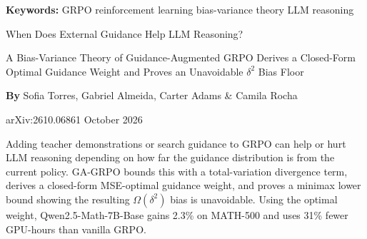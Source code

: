 \documentclass[10pt,twocolumn]{article}
\begin{document}
\setlength{\parindent}{0pt}
\setlength{\parskip}{4pt}

{\small\color{keywordgray}\textbf{Keywords:}
  GRPO \textbullet{}
  reinforcement learning \textbullet{}
  bias-variance theory \textbullet{}
  LLM reasoning}\par\vspace{4pt}

{\LARGE\bfseries\raggedright
  When Does External Guidance Help LLM Reasoning?}\par\vspace{4pt}

{\large\itshape\raggedright
  A Bias-Variance Theory of Guidance-Augmented GRPO Derives a Closed-Form
  Optimal Guidance Weight and Proves an Unavoidable $\delta^2$ Bias Floor}\par\vspace{6pt}

{\small\textbf{By} Sofia Torres, Gabriel Almeida, Carter Adams \& Camila Rocha}\par\vspace{2pt}

{\small\color{keywordgray}arXiv:2610.06861 \textbullet{} October 2026}
\par\vspace{2pt}\noindent{\color{rulered}\rule{\columnwidth}{0.6pt}}\vspace{6pt}

Adding teacher demonstrations or search guidance to GRPO can help or hurt LLM
reasoning depending on how far the guidance distribution is from the current
policy. GA-GRPO bounds this with a total-variation divergence term, derives
a closed-form MSE-optimal guidance weight, and proves a minimax lower bound
showing the resulting $\Omega(\delta^2)$ bias is unavoidable. Using the
optimal weight, Qwen2.5-Math-7B-Base gains 2.3\% on MATH-500 and uses
31\% fewer GPU-hours than vanilla GRPO.
\end{document}
